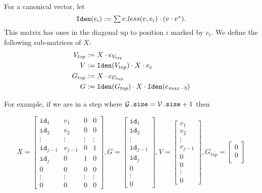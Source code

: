For a canonical vector, let $$\texttt{Iden}(e_i):=\textstyle\sum v. less(v,e_i)\cdot (v\cdot v^*).$$ This matrix has ones in the diagonal up to position $i$ marked by $e_{i}$. We define the following sub-matrices of $X$:
\begin{align*}
	V_{top} &:= X\cdot e_{V_{top}} \\
	V &:= \texttt{Iden}(V_{top}) \cdot X \cdot e_v \\
 	G_{top} &:=X\cdot e_{G_{top}} \\
 	G &:= \texttt{Iden}(G_{top})\cdot X \cdot \texttt{Iden}(e_{max-3})
\end{align*}

For example, if we are in a step where $\mathcal{G}\texttt{.size}=\mathcal{V}\texttt{.size} + 1$ then

\[
X = \begin{bmatrix}
    \texttt{id}_1 & v_1 & 0 & 0 \\
    \texttt{id}_2 & v_2 & 0 & 0 \\
    \vdots & \vdots & \vdots & \vdots \\
    \texttt{id}_{j-1} & v_{j-1} & 0 & 1 \\
    \texttt{id}_j & 0 & 1 & 0 \\
    0 & 0 & 0 & 0 \\
    \vdots & \vdots & \vdots & \vdots \\
     0 & 0 & 0 & 0
\end{bmatrix}, 
G = \begin{bmatrix}
    \texttt{id}_1  \\
    \texttt{id}_2 \\
    \vdots   \\
    \texttt{id}_{j-1} \\
    \texttt{id}_j \\
    0 \\
    \vdots \\
     0 
\end{bmatrix}, 
V = \begin{bmatrix}
    v_1  \\
    v_2 \\
    \vdots   \\
    v_{j-1} \\
    0 \\
    0 \\
    \vdots \\
     0 
\end{bmatrix}, 
G_{top} = \begin{bmatrix}
    0  \\
    0 \\

\end{bmatrix}\]
